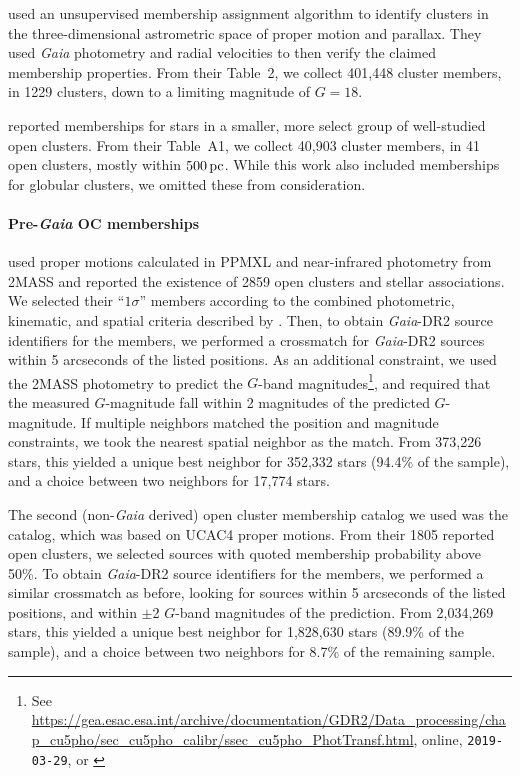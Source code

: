 \documentclass[12pt,twocolumn,tighten]{aastex62}
\begin{document}
\citet{cantat-gaudin_gaia_2018} used an unsupervised membership
assignment algorithm to identify clusters in the three-dimensional
astrometric space of proper motion and parallax. They used {\it Gaia}
photometry and radial velocities to then verify the claimed
membership properties.  From their Table~2, we collect 401{,}448
cluster members, in 1229 clusters, down to a limiting magnitude of
$G=18$.

\citet{gaia_hr_2018} reported memberships for stars in a smaller, more
select group of well-studied open clusters. From their Table~A1, we
collect 40{,}903 cluster members, in 41 open clusters, mostly within
$500\,{\rm pc}$. While this work also included memberships for
globular clusters, we omitted these from consideration.


\paragraph{Pre-{\it Gaia} OC memberships}
\citet{Kharchenko_et_al_2013} used proper motions calculated in PPMXL
\citep[][a combination of USNO-B1{.}0 and 2MASS
astrometry]{roeser_ppmxl_2010} and near-infrared photometry from 2MASS
\citep{skrutskie_tmass_2006} and reported the existence of 2859 open
clusters and stellar associations.
We selected their ``$1\sigma$'' members according to the
combined photometric, kinematic, and spatial criteria described by
\citet{kharchenko_global_2012}.  Then, to obtain {\it Gaia}-DR2 source
identifiers for the members, we performed a crossmatch for {\it
Gaia}-DR2 sources within 5 arcseconds of the listed positions.  As an
additional constraint, we used the 2MASS photometry to predict the
$G$-band magnitudes\footnote{See
\url{https://gea.esac.esa.int/archive/documentation/GDR2/Data_processing/chap_cu5pho/sec_cu5pho_calibr/ssec_cu5pho_PhotTransf.html},
online, \texttt{2019-03-29}, or \citet{carrasco_gaia_2016}}, and
required that the measured $G$-magnitude fall within 2 magnitudes of
the predicted $G$-magnitude.  If multiple neighbors matched the
position and magnitude constraints, we took the nearest spatial
neighbor as the match.  From 373{,}226 stars, this yielded a unique
best neighbor for 352{,}332 stars (94.4\% of the sample), and a choice
between two neighbors for 17{,}774 stars. 

The second (non-{\it Gaia} derived) open cluster membership catalog we
used was the \citet{dias_proper_2014} catalog, which was based on
UCAC4 proper motions.
From their 1805 reported open clusters, we selected sources with
quoted membership probability above 50\%.
To obtain {\it Gaia}-DR2 source identifiers for the members, we
performed a similar crossmatch as before, looking for sources within 5
arcseconds of the listed positions, and within $\pm$2 $G$-band
magnitudes of the prediction.
From 2{,}034{,}269 stars, this yielded a unique
best neighbor for 1{,}828{,}630 stars (89.9\% of the sample), and a choice
between two neighbors for 8.7\% of the remaining sample. 
\end{document}
